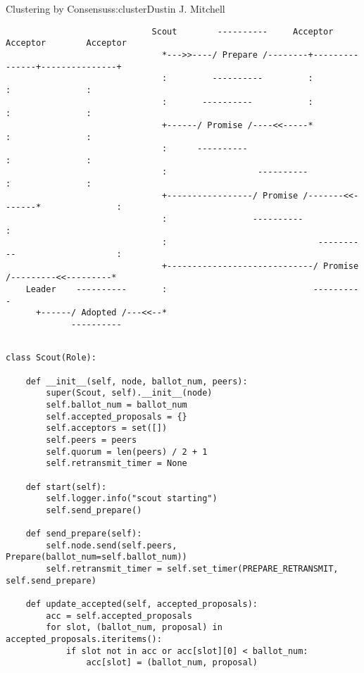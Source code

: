 \begin{aosachapter}{Clustering by Consensus}{s:cluster}{Dustin J. Mitchell}
\begin{verbatim}
                             Scout        ----------     Acceptor        Acceptor        Acceptor
                               *--->>----/ Prepare /--------+---------------+---------------+
                               :         ----------         :               :               :
                               :       ----------           :               :               :
                               +------/ Promise /----<<-----*               :               :
                               :      ----------                            :               :
                               :                  ----------                :               :
                               +-----------------/ Promise /-------<<-------*               :
                               :                 ----------                                 :
                               :                              ----------                    :
                               +-----------------------------/ Promise /---------<<---------*
    Leader    ----------       :                             ---------- 
      +------/ Adopted /---<<--*
             ----------   
\end{verbatim}

\begin{verbatim}

class Scout(Role):

    def __init__(self, node, ballot_num, peers):
        super(Scout, self).__init__(node)
        self.ballot_num = ballot_num
        self.accepted_proposals = {}
        self.acceptors = set([])
        self.peers = peers
        self.quorum = len(peers) / 2 + 1
        self.retransmit_timer = None

    def start(self):
        self.logger.info("scout starting")
        self.send_prepare()

    def send_prepare(self):
        self.node.send(self.peers, Prepare(ballot_num=self.ballot_num))
        self.retransmit_timer = self.set_timer(PREPARE_RETRANSMIT, self.send_prepare)

    def update_accepted(self, accepted_proposals):
        acc = self.accepted_proposals
        for slot, (ballot_num, proposal) in accepted_proposals.iteritems():
            if slot not in acc or acc[slot][0] < ballot_num:
                acc[slot] = (ballot_num, proposal)


\end{verbatim}
\end{aosachapter}
